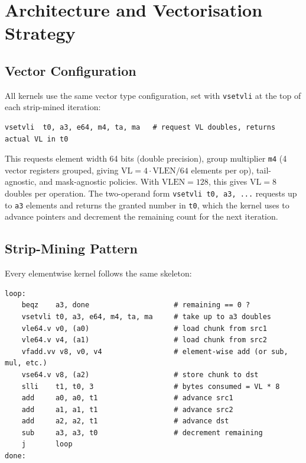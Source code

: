 \documentclass[11pt,a4paper]{article}
\begin{document}
\section{Architecture and Vectorisation Strategy}

\subsection{Vector Configuration}

All kernels use the same vector type configuration, set with \texttt{vsetvli}
at the top of each strip-mined iteration:

\begin{lstlisting}[caption={Vector type configuration (e64, m4, ta, ma)}]
vsetvli  t0, a3, e64, m4, ta, ma   # request VL doubles, returns actual VL in t0
\end{lstlisting}

This requests element width 64 bits (double precision), group multiplier
\texttt{m4} (4 vector registers grouped, giving $\mathrm{VL} = 4 \cdot
\mathrm{VLEN}/64$ elements per op), tail-agnostic, and mask-agnostic policies.
With $\mathrm{VLEN}=128$, this gives $\mathrm{VL} = 8$ doubles per
operation. The two-operand form \texttt{vsetvli t0, a3, ...} requests up to
\texttt{a3} elements and returns the granted number in \texttt{t0}, which
the kernel uses to advance pointers and decrement the remaining count for
the next iteration.

\subsection{Strip-Mining Pattern}

Every elementwise kernel follows the same skeleton:

\begin{lstlisting}[caption={Generic strip-mining loop pattern used in all elementwise kernels}]
loop:
    beqz    a3, done                    # remaining == 0 ?
    vsetvli t0, a3, e64, m4, ta, ma     # take up to a3 doubles
    vle64.v v0, (a0)                    # load chunk from src1
    vle64.v v4, (a1)                    # load chunk from src2
    vfadd.vv v8, v0, v4                 # element-wise add (or sub, mul, etc.)
    vse64.v v8, (a2)                    # store chunk to dst
    slli    t1, t0, 3                   # bytes consumed = VL * 8
    add     a0, a0, t1                  # advance src1
    add     a1, a1, t1                  # advance src2
    add     a2, a2, t1                  # advance dst
    sub     a3, a3, t0                  # decrement remaining
    j       loop
done:
\end{lstlisting}
\end{document}
